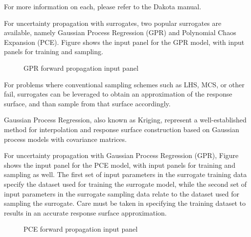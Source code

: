 For more information on each, please refer to the Dakota manual. 


For uncertainty propagation with surrogates, two popular surrogates are available, namely Gaussian Process Regression (GPR) and Polynomial Chaos Expansion (PCE). Figure  shows the input panel for the GPR model, with input panels for training and sampling. 

\begin{figure}[!htbp]
  \caption{GPR forward propagation input panel}
  \label{fig:gpr}
\end{figure}

For problems where conventional sampling schemes such as LHS, MCS, or other fail, surrogates can be leveraged to obtain an approximation of the response surface, and than sample from that surface accordingly. 

Gaussian Process Regression, also known as Kriging, represent a well-established method for interpolation and response surface construction based on Gaussian process models with covariance matrices.  

For uncertainty propagation with Gaussian Process Regression (GPR), Figure  shows the input panel for the PCE model, with input panels for training and sampling as well. The first set of input parameters in the surrogate training data specify the dataset used for training the surrogate model, while the second set of input parameters in the surrogate sampling data relate to the dataset used for sampling the surrogate. Care must be taken in specifying the training dataset to results in an accurate response surface approximation. 

\begin{figure}[!htbp]
  \caption{PCE forward propagation input panel}
  \label{fig:pce}
\end{figure}

